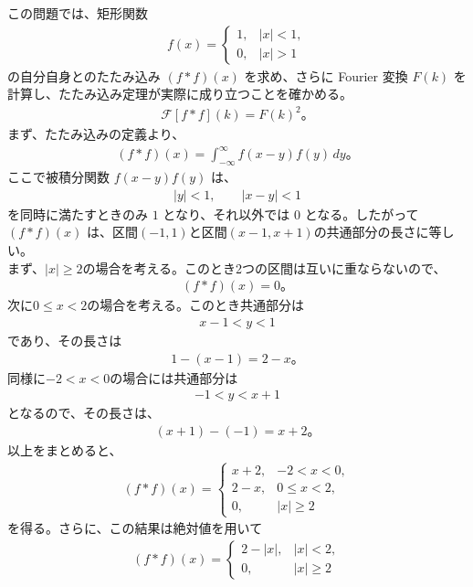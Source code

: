 \documentclass[platex,dvipdfmx,a4paper]{jsarticle}
\begin{document}
  この問題では、矩形関数
  \begin{align*}
    f(x)=
    \begin{cases}
      1,& |x|<1,\\
      0,& |x|>1
    \end{cases}
  \end{align*}
  の自分自身とのたたみ込み $(f*f)(x)$ を求め、さらに Fourier 変換 $F(k)$ を計算し、たたみ込み定理が実際に成り立つことを確かめる。
  \begin{align*}
    \mathcal{F}[f*f](k)=F(k)^2。
  \end{align*}
  まず、たたみ込みの定義より、
  \begin{align*}
    (f*f)(x)
    =
    \int_{-\infty}^{\infty}
    f(x-y)f(y)\,dy。
  \end{align*}
  ここで被積分関数 $f(x-y)f(y)$ は、
  \begin{align*}
    |y|<1,
    \qquad
    |x-y|<1
  \end{align*}
  を同時に満たすときのみ $1$ となり、それ以外では $0$ となる。したがって $(f*f)(x)$ は、区間$(-1,1)$と区間$(x-1,x+1)$の共通部分の長さに等しい。\\
  まず、$|x|\ge 2$の場合を考える。このとき2つの区間は互いに重ならないので、
  \begin{align*}
    (f*f)(x)=0。
  \end{align*}
  次に$0\le x<2$の場合を考える。このとき共通部分は
  \begin{align*}
    x-1<y<1
  \end{align*}
  であり、その長さは
  \begin{align*}
    1-(x-1)
    =
    2-x。
  \end{align*}
  同様に$-2<x<0$の場合には共通部分は
  \begin{align*}
    -1<y<x+1
  \end{align*}
  となるので、その長さは、
  \begin{align*}
    (x+1)-(-1)
    =
    x+2。
  \end{align*}
  以上をまとめると、
  \begin{align*}
    (f*f)(x)
    =
    \begin{cases}
      x+2,& -2<x<0,\\
      2-x,& 0\le x<2,\\
      0,& |x|\ge 2
    \end{cases}
  \end{align*}
  を得る。さらに、この結果は絶対値を用いて
  \begin{align*}
    (f*f)(x)
    =
    \begin{cases}
      2-|x|,& |x|<2,\\
      0,& |x|\ge 2
    \end{cases}
  \end{align*}
\end{document}
